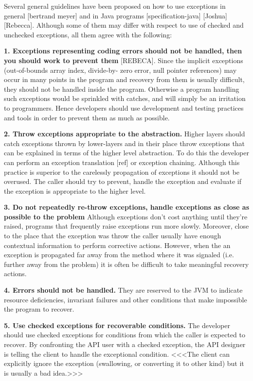 \documentclass[conference]{IEEEtran}
\begin{document}
Several general guidelines have been proposed on how to use exceptions in general [bertrand meyer] and in Java programs [specification-java] [Joshua] [Rebecca]. Although some of them may differ with respect to use of checked and unchecked exceptions, all them agree with the following:


\textbf{1. Exceptions representing coding errors should not be handled, then you should work to prevent them} [REBECA].  Since the implicit exceptions (out-of-bounds array index, divide-by- zero error, null pointer references) may occur in many points in the program  and recovery from them is usually difficult, they should not be handled inside the program. Otherwise a program handling such exceptions would be sprinkled with catches, and will simply be an irritation to programmers. Hence developers should use development and testing practices and tools in order to prevent them as much as possible. 

\textbf{2. Throw exceptions appropriate to the abstraction.} Higher layers should catch exceptions thrown by lower-layers and in their place throw exceptions that can be explained in terms of the higher level abstraction. To do this the developer can perform an exception translation [ref] or exception chaining. Although this practice is superior to the carelessly propagation of exceptions it should not be overused. The caller should try to prevent, handle the exception and evaluate if the exception is appropriate to the higher level.

\textbf{3. Do not repeatedly re-throw exceptions, handle exceptions as close as possible to the problem} Although exceptions don’t cost anything until they’re raised, programs that frequently raise exceptions run more slowly. Moreover, close to the place that the exception was throw the caller usually have enough contextual information to perform  corrective actions. However, when the an exception is propagated far away from the method where it was signaled (i.e. further away from the problem) it is often be difficult to take meaningful recovery actions.

\textbf{4. Errors should not be handled.} They are reserved to the JVM to indicate resource deficiencies, invariant failures and other conditions that make impossible the program to recover.

\textbf{5. Use checked exceptions for recoverable conditions.} The developer should use checked exceptions for conditions from which the caller is expected to recover. By confronting the API user with a checked exception, the API designer is telling the client to handle the exceptional condition. <<<The client can explicitly ignore the exception (swallowing, or converting it to other kind) but it is usually a bad idea.>>>
\end{document}
